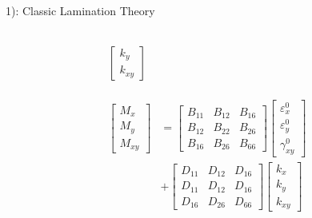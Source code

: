 \documentclass{beamer}
\begin{document}
\begin{frame}{1): Classic Lamination Theory}
\begin{columns}[c]
\begin{column}{0.5\textwidth}
\begin{equation}
\begin{array}{l}
\begin{aligned}
\begin{bmatrix}
				k_y \\
				k_{xy} 
			\end{bmatrix}  \\
		\end{aligned} \\ \\
		\begin{aligned}
			\begin{bmatrix}
				M_x \\
				M_y \\
				M_{xy}
			\end{bmatrix}
			&=
			\begin{bmatrix}
				B_{11} & B_{12} & B_{16} \\
				B_{12} & B_{22} & B_{26} \\
				B_{16} & B_{26} & B_{66} 
			\end{bmatrix}
			\begin{bmatrix}
				\varepsilon_x^0 \\
				\varepsilon_y^0 \\
				\gamma_{xy}^0
			\end{bmatrix} \\ 
			&+  
			\begin{bmatrix}
				D_{11} & D_{12} & D_{16} \\
				D_{11} & D_{12} & D_{16} \\
				D_{16} & D_{26} & D_{66} 
			\end{bmatrix}
			\begin{bmatrix}
				k_x \\
				k_y \\
				k_{xy} 
			\end{bmatrix}
		\end{aligned}
			\end{array}
		\end{equation}
	\end{column}
\end{columns}
\end{frame}
\end{document}
